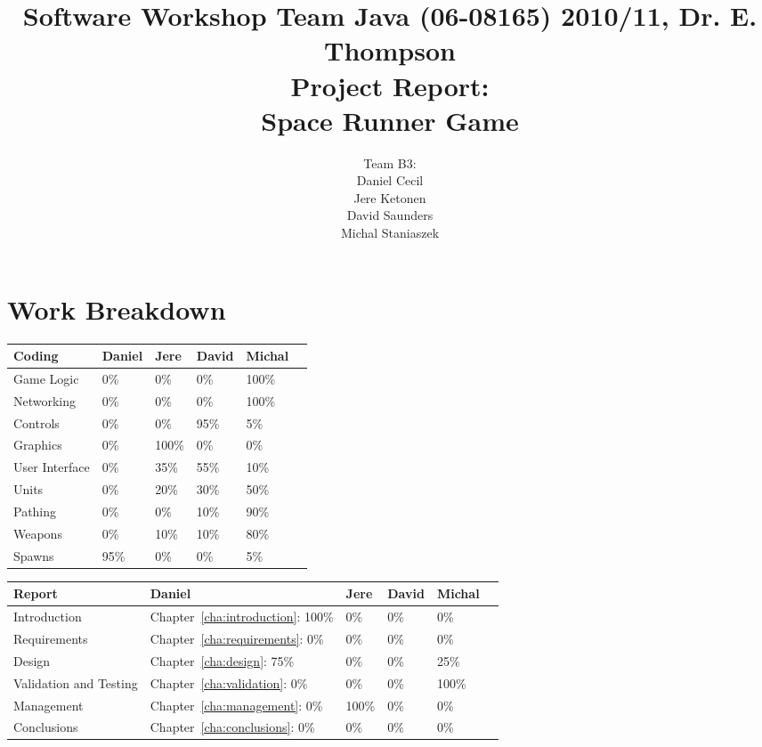 \documentclass[10pt]{report}
\title{%
{\normalsize Software Workshop Team Java (06-08165) 2010/11, Dr. E. Thompson}\\[2cm]
Project Report:\\
Space Runner Game}
\author{Team B3:\\
Daniel Cecil\\
Jere Ketonen\\
David Saunders\\
Michal Staniaszek
}
\begin{document}
\maketitle
\tableofcontents
\chapter*{Work Breakdown}
\label{work-breakdown}

\thispagestyle{empty}

{\small
\centering
\noindent\begin{tabular}{|l||l|l|l|l|l|}\hline
  \textbf{Coding} & \textbf{Daniel} & \textbf{Jere} & \textbf{David}
  & \textbf{Michal} \\\hline\hline
  Game Logic &  0\% & 0\% & 0\% & 100\%\\\hline
  Networking &  0\% & 0\% & 0\% & 100\%\\\hline
  Controls &  0\% & 0\% & 95\% & 5\%\\\hline
  Graphics &  0\% & 100\% & 0\% & 0\%\\\hline
  User Interface &  0\% & 35\% & 55\% & 10\%\\\hline
  Units &  0\% & 20\% & 30\% & 50\%\\\hline
  Pathing &  0\% & 0\% & 10\% & 90\%\\\hline
  Weapons &  0\% & 10\% & 10\% & 80\%\\\hline
  Spawns &  95\% & 0\% & 0\% & 5\%\\\hline
\end{tabular}\vspace*{1cm}

   \noindent\begin{tabular}{|l||l|l|l|l|l|}\hline
     \textbf{Report} & \textbf{Daniel} & \textbf{Jere} & \textbf{David}
     & \textbf{Michal}\\\hline\hline
     Introduction & Chapter~\ref{cha:introduction}: 100\% & 0\% & 0\% & 0\%\\\hline
     Requirements & Chapter~\ref{cha:requirements}: 0\% & 0\% & 0\% & 0\%\\\hline
     Design & Chapter~\ref{cha:design}: 75\% & 0\% & 0\% & 25\%\\\hline
     Validation and Testing & Chapter~\ref{cha:validation}: 0\% & 0\% & 0\% & 100\%\\\hline
     Management & Chapter~\ref{cha:management}: 0\% & 100\% & 0\% & 0\%\\\hline
     Conclusions & Chapter~\ref{cha:conclusions}: 0\% & 0\% & 0\% & 0\%\\\hline
   \end{tabular}

}
\end{document}
